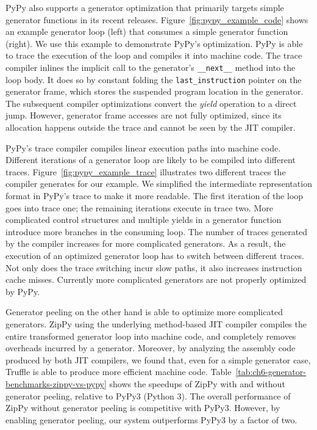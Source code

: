 PyPy also supports a generator optimization that primarily targets simple generator functions in its recent releases.
Figure~\ref{fig:pypy_example_code} shows an example generator loop (left) that consumes a simple generator function (right).
We use this example to demonstrate PyPy's optimization.
PyPy is able to trace the execution of the loop and compiles it into machine code.
The trace compiler inlines the implicit call to the generator's \texttt{\_\_next\_\_} method into the loop body.
It does so by constant folding the \texttt{last\_instruction} pointer on the generator frame, which stores the suspended program location in the generator.
The subsequent compiler optimizations convert the \emph{yield} operation to a direct jump.
However, generator frame accesses are not fully optimized, since its allocation happens outside the trace and cannot be seen by the JIT compiler.

PyPy's trace compiler compiles linear execution paths into machine code.
Different iterations of a generator loop are likely to be compiled into different traces.
Figure~\ref{fig:pypy_example_trace} illustrates two different traces the compiler generates for our example.
We simplified the intermediate representation format in PyPy's trace to make it more readable.
The first iteration of the loop goes into trace one; the remaining iterations execute in trace two.
More complicated control structures and multiple yields in a generator function introduce more branches in the consuming loop.
The number of traces generated by the compiler increases for more complicated generators.
As a result, the execution of an optimized generator loop has to switch between different traces.
Not only does the trace switching incur slow paths, it also increases instruction cache misses.
Currently more complicated generators are not properly optimized by PyPy.

Generator peeling on the other hand is able to optimize more complicated generators.
ZipPy using the underlying method-based JIT compiler compiles the entire transformed generator loop into machine code, and completely removes overheads incurred by a generator.
Moreover, by analyzing the assembly code produced by both JIT compilers, we found that, even for a simple generator case, Truffle is able to produce more efficient machine code.
Table~\ref{tab:ch6-generator-benchmarks-zippy-vs-pypy} shows the speedups of ZipPy with and without generator peeling, relative to PyPy3 (Python 3).
The overall performance of ZipPy without generator peeling is competitive with PyPy3.
However, by enabling generator peeling, our system outperforms PyPy3 by a factor of two.
